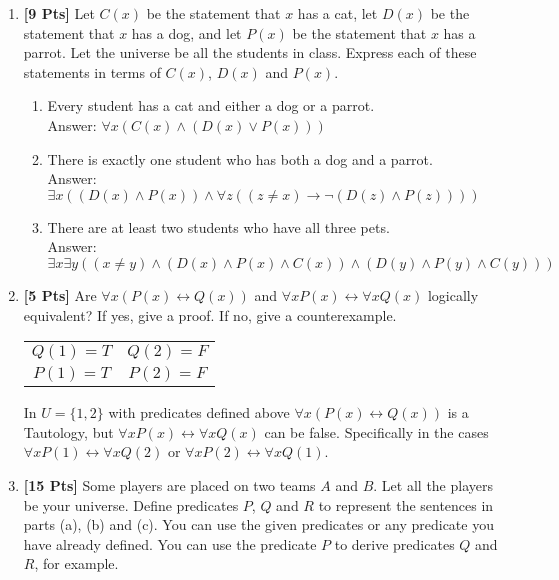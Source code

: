 \begin{enumerate}

\item {\bf [9 Pts]} Let $C(x)$ be the statement that $x$ has a cat, let $D(x)$ be the statement that $x$ has a dog, and let $P(x)$ be the statement that $x$ has a parrot. Let the universe be all the students in class. 
Express each of these statements in terms of $C(x)$, $D(x)$ and $P(x)$.

\begin{enumerate}

\item Every student has a cat and either a dog or a parrot.\\
Answer: $\forall x (C(x) \wedge ( D(x) \vee P(x) ))$

\item There is exactly one student who has both a dog and a parrot.\\
Answer: $\exists x ( (D(x) \wedge P(x)) \wedge \forall z ( (z \neq x) \rightarrow \neg ( D(z) \wedge P(z) ) ) )$

\item There are at least two students who have all three pets.\\
Answer: $\exists x \exists y ( ( x \neq y ) \wedge (D(x) \wedge P(x) \wedge C(x)) \wedge  (D(y) \wedge P(y) \wedge C(y)) )$

\end{enumerate}
\clearpage
\item {\bf [5 Pts]} Are $\forall x (P(x) \leftrightarrow Q(x))$ and $\forall x P(x) \leftrightarrow \forall x Q(x)$ logically equivalent? 
         If yes, give a proof. If no, give a counterexample.
         
         \begin{table}[h]
		\centering
		\begin{tabular}{cc}
		$Q(1) = T$ & $Q(2) = F$ \\
		$P(1) = T$ & $P(2) = F$ 
		\end{tabular}
	\end{table}
	
	In $U = \{1,2\}$ with predicates defined above $\forall x (P(x) \leftrightarrow Q(x))$ is a Tautology, but $\forall x P(x) \leftrightarrow \forall x Q(x)$ can be false. Specifically in the cases $\forall x P(1) \leftrightarrow \forall x Q(2)$ or $\forall x P(2) \leftrightarrow \forall x Q(1)$.

\clearpage

\item {\bf [15 Pts]} Some players are placed on two teams $A$ and $B$. Let all the players be your universe. Define predicates $P$, $Q$ and $R$ to represent the sentences in parts (a), (b) and (c). You can use the given predicates or any predicate you have already defined. You can use the predicate $P$ to derive predicates $Q$ and $R$, for example.


\end{enumerate}
